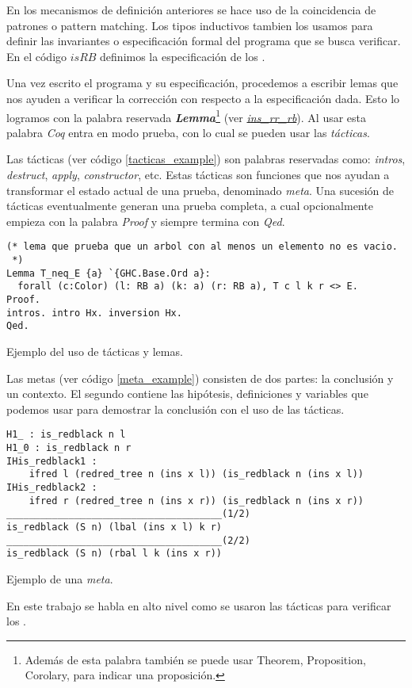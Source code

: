 En los mecanismos de definición anteriores se hace uso de la coincidencia de patrones o pattern matching. Los tipos inductivos tambien los usamos para definir las invariantes o especificación formal del programa 
que se busca verificar. En el c\'odigo \hyperref[inductive_isRB]{$isRB$} definimos la especificación 
de los {\arns}.

Una vez escrito el programa y su especificación, procedemos a escribir lemas que nos ayuden a verificar
la correcci\'on con respecto a la especificación dada. Esto lo logramos con la palabra reservada 
\textbf{\textit{Lemma}}\footnote{Además de esta palabra también se puede usar Theorem, Proposition, Corolary, para indicar una proposición.} (ver \hyperref[lema_1]{\textit{ins\_rr\_rb}}). Al usar esta palabra \textit{Coq} entra en modo 
prueba, con lo cual se pueden usar las \textit{t\'acticas}.

Las t\'acticas (ver c\'odigo \ref{tacticas_example}) son palabras reservadas como: \textit{intros}, \textit{destruct}, \textit{apply}, \textit{constructor}, etc. Estas 
t\'acticas son funciones que nos ayudan a transformar el estado actual de una prueba, denominado \textit{meta}. Una
sucesión de t\'acticas eventualmente generan una prueba completa, a cual opcionalmente empieza con la palabra \textit{Proof} y siempre termina con \textit{Qed}.

\begin{listing}[!ht]
\centering
\captionsetup{justification=centering}
\begin{verbatim}
(* lema que prueba que un arbol con al menos un elemento no es vacio.
 *)
Lemma T_neq_E {a} `{GHC.Base.Ord a}:
  forall (c:Color) (l: RB a) (k: a) (r: RB a), T c l k r <> E.
Proof.
intros. intro Hx. inversion Hx.
Qed.
\end{verbatim}
\caption{Ejemplo del uso de t\'acticas y lemas.}
\label{tacticas_example}
\end{listing}

Las metas (ver c\'odigo \ref{meta_example}) consisten de dos partes: la conclusi\'on y un contexto. El segundo contiene las hip\'otesis, definiciones y variables que podemos 
usar para demostrar la conclusi\'on con el uso de las t\'acticas. 
\begin{listing}[!ht]
\centering
\captionsetup{justification=centering}
\begin{verbatim}
H1_ : is_redblack n l
H1_0 : is_redblack n r
IHis_redblack1 :
    ifred l (redred_tree n (ins x l)) (is_redblack n (ins x l))
IHis_redblack2 :
    ifred r (redred_tree n (ins x r)) (is_redblack n (ins x r))
______________________________________(1/2)
is_redblack (S n) (lbal (ins x l) k r)
______________________________________(2/2)
is_redblack (S n) (rbal l k (ins x r))
\end{verbatim}
\caption{Ejemplo de una \textit{meta}.}
\label{meta_example}
\end{listing}
En este trabajo se habla en alto nivel como se usaron las t\'acticas para verificar los {\arns}.



